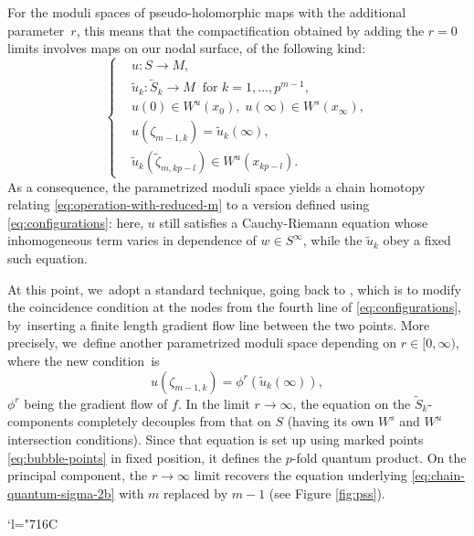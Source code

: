 \documentclass[JEP,XML,SOM,Unicode,NoFloatCountersInSection,published]{cedram}
\newcommand{\Changelback}{\mathcode`l="716C}
\theoremstyle{plain}
\theoremstyle{definition}
\begin{document}
For the moduli spaces of pseudo-holomorphic maps with the additional parameter~$r$, this means that the compactification obtained by adding the $r = 0$ limits involves maps on our nodal surface, of the following kind:
\begin{equation}\label{eq:configurations}
\left\{
\begin{aligned}
& u: S \to M, \\
& \tilde{u}_k: \tilde{S}_k \to M\;\; \text{for $k = 1,\dots,p^{m-1}$}, \\
& u(0) \in W^u(x_0), \; u(\infty) \in W^s(x_\infty), \\
& u(\zeta_{m-1,k}) = \tilde{u}_k(\infty), \\
& \tilde{u}_k(\tilde\zeta_{m,kp-l}) \in W^u(x_{kp-l}).
\end{aligned}
\right.
\end{equation}
As a consequence, the parametrized moduli space yields a chain homotopy relating \eqref{eq:operation-with-reduced-m} to a version defined using \eqref{eq:configurations}: here, $u$ still satisfies a Cauchy-Riemann equation whose inhomogeneous term varies in dependence of $w \in S^\infty$, while the $\tilde{u}_k$ obey a fixed such equation.

At this point, we~adopt a standard technique, going back to \cite{piunikhin-salamon-schwarz94}, which is to modify the coincidence condition at the nodes from the fourth line of \eqref{eq:configurations}, by~inserting a finite length gradient flow line between the two points. More precisely, we~define another parametrized moduli space depending on $r \in [0,\infty)$, where the new condition~is
\begin{equation}\label{eq:pss}
u(\zeta_{m-1,k}) = \phi^r(\tilde{u}_k(\infty)),
\end{equation}
$\phi^r$ being the gradient flow of $f$. In the limit $r \to \infty$, the equation on the $\tilde{S}_k$\nobreakdash-com\-po\-nents completely decouples from that on $S$ (having its own $W^s$ and $W^u$ intersection conditions). Since that equation is set up using marked points \eqref{eq:bubble-points} in fixed position, it defines the $p$-fold quantum product. On the principal component, the $r \to \infty$ limit recovers the equation underlying \eqref{eq:chain-quantum-sigma-2b} with $m$ replaced by $m-1$ (see Figure \ref{fig:pss}).

\Changelback
\end{document}
